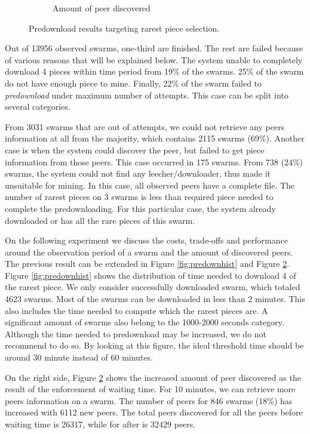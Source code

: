 \begin{figure}[h!]
\begin{adjustwidth}{-2cm}{}
\begin{subfigure}[t]{0.6\textwidth}
		\caption{Amount of peer discovered}
		\label{fig:peeramount}
	\end{subfigure}
	\caption{Predownload results targeting rarest piece selection.
		}
	\end{adjustwidth}
\end{figure}

Out of 13956 observed swarms, one-third are finished. The rest are failed because of various reasons that will be explained below. The system unable to completely download 4 pieces within time period from 19\% of the swarms. 25\% of the swarm do not have enough piece to mine. Finally, 22\% of the swarm failed to \textit{predownload} under maximum number of attempts. This case can be split into several categories. 

From 3031 swarms that are out of attempts, we could not retrieve any peers information at all from the majority, which contains 2115 swarms (69\%). Another case is when the system could discover the peer, but failed to get piece information from those peers. This case occurred in 175 swarms. From 738 (24\%) swarms, the system could not find any leecher/downloader, thus made it unsuitable for mining. In this case, all observed peers have a complete file. The number of rarest pieces on 3 swarms is less than required piece needed to complete the predownloading. For this particular case, the system already downloaded or has all the rare pieces of this swarm.

On the following experiment we discuss the costs, trade-offs and performance around the observation period of a swarm and the amount of discovered peers. The previous result can be extended in Figure \ref{fig:predownhist} and Figure \ref{fig:peeramount}. Figure \ref{fig:predownhist} shows the distribution of time needed to download 4 of the rarest piece. We only consider successfully downloaded swarm, which totaled 4623 swarms. Most of the swarms can be downloaded in less than 2 minutes. This also includes the time needed to compute which the rarest pieces are. A significant amount of swarms also belong to the 1000-2000 seconds category. Although the time needed to predownload may be increased, we do not recommend to do so. By looking at this figure, the ideal threshold time should be around 30 minute instead of 60 minutes. 


On the right side, Figure \ref{fig:peeramount} shows the increased amount of peer discovered as the result of the enforcement of waiting time. For 10 minutes, we can retrieve more peers information on a swarm. The number of peers for 846 swarms (18\%) has increased with 6112 new peers. The total peers discovered for all the peers before waiting time is 26317, while for after is 32429 peers.

